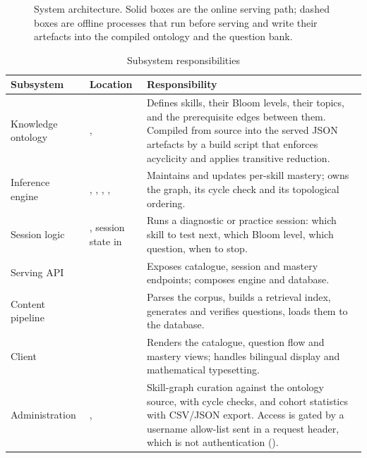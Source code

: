 \begin{figure}[htbp]
  \caption{System architecture. Solid boxes are the online serving path;
    dashed boxes are offline processes that run before serving and write their
    artefacts into the compiled ontology and the question bank.}
  \label{fig:architecture}
\end{figure}

\begin{table}[htbp]
  \centering
  \caption{Subsystem responsibilities}
  \label{tab:modules}
  \begin{tabularx}{\textwidth}{>{\hsize}Y>{\hsize}Y>{\hsize}Y}
    \toprule
    Subsystem & Location & Responsibility \\
    \midrule
    Knowledge ontology & ,  & Defines skills, their Bloom levels, their topics, and the prerequisite edges between them. Compiled from source into the served JSON artefacts by a build script that enforces acyclicity and applies transitive reduction. \\
    Inference engine & , , , ,  & Maintains and updates per-skill mastery; owns the graph, its cycle check and its topological ordering. \\
    Session logic & , session state in  & Runs a diagnostic or practice session: which skill to test next, which Bloom level, which question, when to stop. \\
    Serving API &  & Exposes catalogue, session and mastery endpoints; composes engine and database. \\
    Content pipeline &  & Parses the corpus, builds a retrieval index, generates and verifies questions, loads them to the database. \\
    Client &  & Renders the catalogue, question flow and mastery views; handles bilingual display and mathematical typesetting. \\
    Administration & ,  & Skill-graph curation against the ontology source, with cycle checks, and cohort statistics with CSV/JSON export. Access is gated by a username allow-list sent in a request header, which is not authentication (). \\
    \bottomrule
  \end{tabularx}
\end{table}

